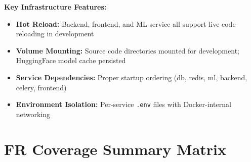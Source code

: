 \documentclass[11pt, a4paper]{article}
\begin{document}
\noindent\textbf{Key Infrastructure Features:}

\begin{itemize}[leftmargin=1.5em, itemsep=3pt]
    \item \textbf{Hot Reload:} Backend, frontend, and ML service all support live code reloading in development
    \item \textbf{Volume Mounting:} Source code directories mounted for development; HuggingFace model cache persisted
    \item \textbf{Service Dependencies:} Proper startup ordering (db, redis, ml, backend, celery, frontend)
    \item \textbf{Environment Isolation:} Per-service \texttt{.env} files with Docker-internal networking
\end{itemize}


\newpage
\section{FR Coverage Summary Matrix}
\end{document}
